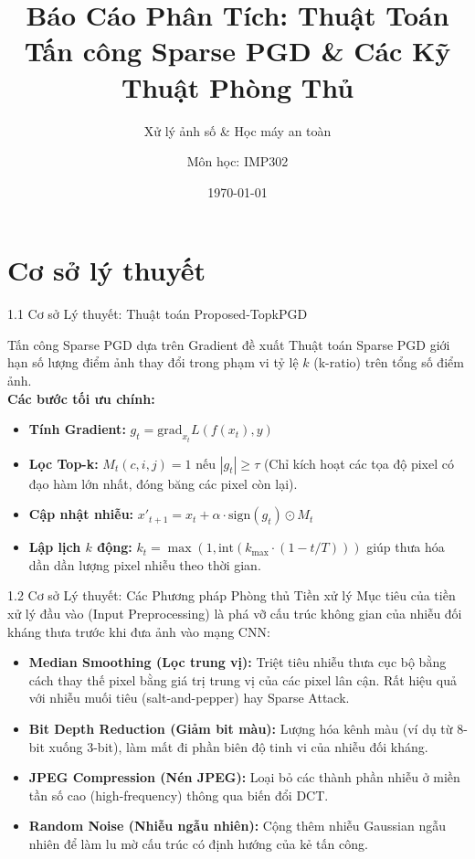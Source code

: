 \documentclass[10pt, xcolor=table]{beamer}
\title[Sparse PGD \& Phòng Thủ]{Báo Cáo Phân Tích: Thuật Toán Tấn công Sparse PGD \& Các Kỹ Thuật Phòng Thủ}
\subtitle{Xử lý ảnh số \& Học máy an toàn}
\author[Môn học: IMP302]{Môn học: IMP302}
\institute[ĐH]{Nguồn dữ liệu dựa trên tài liệu báo cáo phân tích}
\date{\today}
\begin{document}
\begin{frame}
    \titlepage
\end{frame}

\section{Cơ sở lý thuyết}

\begin{frame}{1.1 Cơ sở Lý thuyết: Thuật toán Proposed-TopkPGD}
    \begin{block}{Tấn công Sparse PGD dựa trên Gradient đề xuất}
        Thuật toán Sparse PGD giới hạn số lượng điểm ảnh thay đổi trong phạm vi tỷ lệ $k$ (k-ratio) trên tổng số điểm ảnh. \\
        \textbf{Các bước tối ưu chính:}
        \begin{itemize}
            \item \textbf{Tính Gradient:} $g_t = \text{grad}_{x_t} L(f(x_t), y)$
            \item \textbf{Lọc Top-k:} $M_t(c, i, j) = 1$ nếu $|g_t| \ge \tau$ (Chỉ kích hoạt các tọa độ pixel có đạo hàm lớn nhất, đóng băng các pixel còn lại).
            \item \textbf{Cập nhật nhiễu:} $x'_{t+1} = x_t + \alpha \cdot \text{sign}(g_t) \odot M_t$
            \item \textbf{Lập lịch $k$ động:} $k_t = \max(1, \text{int}(k_{\max} \cdot (1 - t/T)))$ giúp thưa hóa dần dần lượng pixel nhiễu theo thời gian.
        \end{itemize}
    \end{block}
\end{frame}

\begin{frame}{1.2 Cơ sở Lý thuyết: Các Phương pháp Phòng thủ Tiền xử lý}
    Mục tiêu của tiền xử lý đầu vào (Input Preprocessing) là phá vỡ cấu trúc không gian của nhiễu đối kháng thưa trước khi đưa ảnh vào mạng CNN:
    \vspace{0.2cm}
    \begin{itemize}
        \item \textbf{Median Smoothing (Lọc trung vị):} Triệt tiêu nhiễu thưa cục bộ bằng cách thay thế pixel bằng giá trị trung vị của các pixel lân cận. Rất hiệu quả với nhiễu muối tiêu (salt-and-pepper) hay Sparse Attack.
        \item \textbf{Bit Depth Reduction (Giảm bit màu):} Lượng hóa kênh màu (ví dụ từ 8-bit xuống 3-bit), làm mất đi phần biên độ tinh vi của nhiễu đối kháng.
        \item \textbf{JPEG Compression (Nén JPEG):} Loại bỏ các thành phần nhiễu ở miền tần số cao (high-frequency) thông qua biến đổi DCT.
        \item \textbf{Random Noise (Nhiễu ngẫu nhiên):} Cộng thêm nhiễu Gaussian ngẫu nhiên để làm lu mờ cấu trúc có định hướng của kẻ tấn công.
    \end{itemize}
\end{frame}
\end{document}

